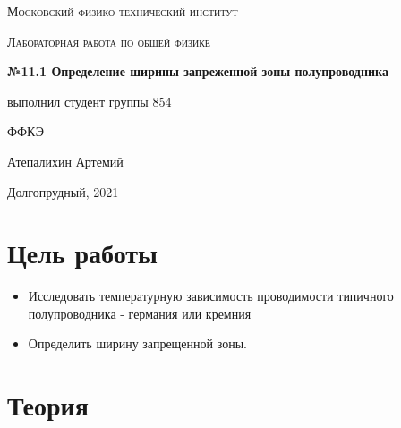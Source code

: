 \documentclass[a4paper]{article}
\begin{document}
\graphicspath{ {pictures/} }

\begin{titlepage}
	\centering
	\vspace{5cm}
    {\scshape\LARGE Московский физико-технический институт\par}
	\vspace{5cm}
	{\scshape\Large Лабораторная работа по общей физике \par}
	\vspace{1cm}
    {\huge\bfseries  №11.1 Определение ширины запреженной зоны полупроводника  \par}
	\vspace{1cm}
	\vfill
    \begin{flushright}
        {\large выполнил студент группы 854}\par
        \vspace{0.3cm}
        {\large ФФКЭ}\par
        \vspace{0.3cm}
        {\LARGE Атепалихин Артемий}
    \end{flushright}
	\vfill
Долгопрудный, 2021
\end{titlepage}


\tableofcontents

\newpage



\section{Цель работы}

\begin{itemize}
    
\item Исследовать температурную зависимость проводимости типичного полупроводника - германия или кремния
\item Определить ширину запрещенной зоны.
\end{itemize}



\section{Теория}
\end{document}
